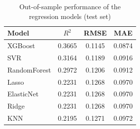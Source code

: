 \begin{table}
\caption{Out-of-sample performance of the regression models (test set)}
\label{tab:reg_performance}
\begin{tabular}{lccc}
\toprule
Model & $R^2$ & RMSE & MAE \\
\midrule
XGBoost & 0.3665 & 0.1145 & 0.0874 \\
SVR & 0.3164 & 0.1189 & 0.0916 \\
RandomForest & 0.2972 & 0.1206 & 0.0912 \\
Lasso & 0.2231 & 0.1268 & 0.0970 \\
ElasticNet & 0.2231 & 0.1268 & 0.0970 \\
Ridge & 0.2231 & 0.1268 & 0.0970 \\
KNN & 0.2195 & 0.1271 & 0.0972 \\
\bottomrule
\end{tabular}
\end{table}
